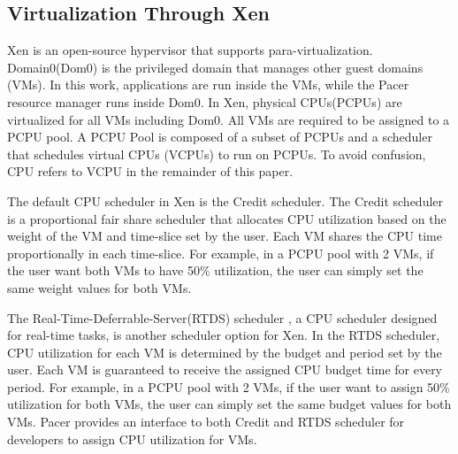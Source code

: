 \subsection{Virtualization Through Xen}
Xen is an open-source hypervisor that supports para-virtualization\cite{xen}. Domain0(Dom0) is the privileged domain that manages other guest domains (VMs). In this work, applications are run inside the VMs, while the Pacer resource manager runs inside Dom0. In Xen, physical CPUs(PCPUs) are virtualized for all VMs including Dom0. All VMs are required to be assigned to a PCPU pool. A PCPU Pool is composed of a subset of PCPUs and a scheduler that schedules virtual CPUs (VCPUs) to run on PCPUs. To avoid confusion, CPU refers to VCPU in the remainder of this paper. 

The default CPU scheduler in Xen is the Credit scheduler\cite{credit}. The Credit scheduler is a proportional fair share scheduler that allocates CPU utilization based on the weight of the VM and time-slice set by the user. Each VM shares the CPU time proportionally in each time-slice. For example, in a PCPU pool with 2 VMs, if the user want both VMs to have 50\% utilization, the user can simply set the same weight values for both VMs.

The Real-Time-Deferrable-Server(RTDS) scheduler \cite{rtxen}, a CPU scheduler designed for real-time tasks, is another scheduler option for Xen. In the RTDS scheduler, CPU utilization for each VM is determined by the budget and period set by the user. Each VM is guaranteed to receive the assigned CPU budget time for every period. For example, in a PCPU pool with 2 VMs, if the user want to assign 50\% utilization for both VMs, the user can simply set the same budget values for both VMs. Pacer provides an interface to both Credit and RTDS scheduler for developers to assign CPU utilization for VMs.



